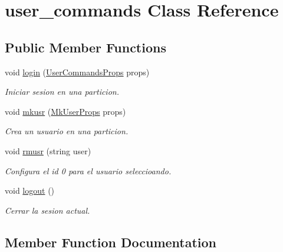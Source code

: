 \hypertarget{classuser__commands}{}\section{user\+\_\+commands Class Reference}
\label{classuser__commands}
\subsection*{Public Member Functions}
\begin{DoxyCompactItemize}
\item 
void \hyperlink{classuser__commands_a1d8f9ded8fcaac8ed4f38b5dd1e84aa9}{login} (\hyperlink{structUserCommandsProps}{User\+Commands\+Props} props)
\begin{DoxyCompactList}\small\item\em Iniciar sesion en una particion. \end{DoxyCompactList}\item 
void \hyperlink{classuser__commands_a3465a40be3ffa4bf21758c1561b42fe5}{mkusr} (\hyperlink{structMkUserProps}{Mk\+User\+Props} props)
\begin{DoxyCompactList}\small\item\em Crea un usuario en una particion. \end{DoxyCompactList}\item 
void \hyperlink{classuser__commands_a1dc49969dc241f97636ec3680c822e3d}{rmusr} (string user)
\begin{DoxyCompactList}\small\item\em Configura el id 0 para el usuario seleccioando. \end{DoxyCompactList}\item 
void \hyperlink{classuser__commands_a9f3307fd8aa6f788c0eddeb2166c5274}{logout} ()
\begin{DoxyCompactList}\small\item\em Cerrar la sesion actual. \end{DoxyCompactList}\end{DoxyCompactItemize}


\subsection{Member Function Documentation}
\mbox{\label{classuser__commands_a1d8f9ded8fcaac8ed4f38b5dd1e84aa9}} 

